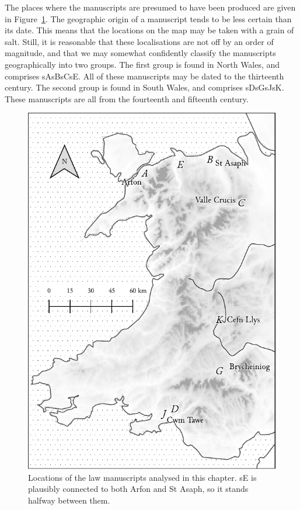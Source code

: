 The places where the manuscripts are presumed to have been produced are given in Figure~\ref{fig:mslocs}. The geographic origin of a manuscript tends to be less certain than its date. This means that the locations on the map may be taken with a grain of salt. Still, it is reasonable that these localisations are not off by an order of magnitude, and that we may somewhat confidently classify the manuscripts geographically into two groups. The first group is found in North Wales, and comprises \gls{sA}\gls{sB}\gls{sC}\gls{sE}. All of these manuscripts may be dated to the thirteenth century. The second group is found in South Wales, and comprises \gls{sD}\gls{sG}\gls{sJ}\gls{sK}. These manuscripts are all from the fourteenth and fifteenth century.

\begin{figure}[h]
  \centering
  \includegraphics{3orth/images/mslocations.pdf}
  \caption[Locations of the law manuscripts.]{Locations of the law manuscripts analysed in this chapter. \gls{sE} is plausibly connected to both Arfon and St Asaph, so it stands halfway between them.}
  \label{fig:mslocs}
\end{figure}



